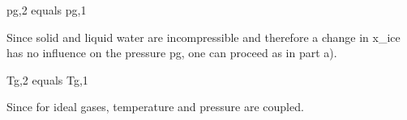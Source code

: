 pg,2 equals pg,1  

Since solid and liquid water are incompressible and therefore a change in x_ice has no influence on the pressure pg, one can proceed as in part a).  

Tg,2 equals Tg,1  

Since for ideal gases, temperature and pressure are coupled.
